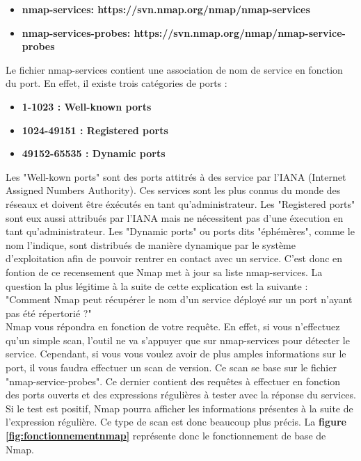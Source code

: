 \begin{itemize}
    \item \textbf{nmap-services: https://svn.nmap.org/nmap/nmap-services}
    \item \textbf{nmap-services-probes: https://svn.nmap.org/nmap/nmap-service-probes}
\end{itemize}

\noindent Le fichier nmap-services contient une association de nom de service en fonction du port. En effet, il existe trois catégories de ports :

\begin{itemize}
    \item \textbf{1-1023 : Well-known ports}
    \item \textbf{1024-49151 : Registered ports}
    \item \textbf{49152-65535 : Dynamic ports}
\end{itemize}

\noindent Les "Well-kown ports" sont des ports attitrés à des service par l'IANA (Internet Assigned Numbers Authority). Ces services sont les plus connus du monde des réseaux et doivent être éxécutés en tant qu'administrateur. Les "Registered ports" sont eux aussi attribués par l'IANA mais ne nécessitent pas d'une éxecution en tant qu'administrateur. Les "Dynamic ports" ou ports dits "éphémères", comme le nom l'indique, sont distribués de manière dynamique par le système d'exploitation afin de pouvoir rentrer en contact avec un service. C'est donc en fontion de ce recensement que Nmap met à jour sa liste nmap-services. La question la plus légitime à la suite de cette explication est la suivante :\\
"Comment Nmap peut récupérer le nom d'un service déployé sur un port n'ayant pas été répertorié ?"\\
Nmap vous répondra en fonction de votre requête. En effet, si vous n'effectuez qu'un simple scan, l'outil ne va s'appuyer que sur nmap-services pour détecter le service. Cependant, si vous vous voulez avoir de plus amples informations sur le port, il vous faudra effectuer un scan de version. Ce scan se base sur le fichier "nmap-service-probes". Ce dernier contient des requêtes à effectuer en fonction des ports ouverts et des expressions régulières à tester avec la réponse du services. Si le test est positif, Nmap pourra afficher les informations présentes à la suite de l'expression régulière. Ce type de scan est donc beaucoup plus précis. La \textbf{figure \ref{fig:fonctionnementnmap}} représente donc le fonctionnement de base de Nmap.

